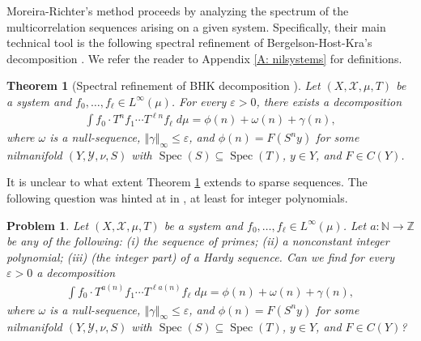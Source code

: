 \documentclass[11pt]{amsart}
\newtheorem{theorem}[lemma]{Theorem}
\newtheorem{problem}{Problem}
\theoremstyle{definition}
\newcommand{\N}{{\mathbb N}}
\newcommand{\Z}{{\mathbb Z}}
\newcommand{\CX}{{\mathcal X}}
\newcommand{\CY}{{\mathcal Y}}
\newcommand{\veps}{\varepsilon}
\newcommand{\norm}[1]{\left\Vert #1\right\Vert}
\newcommand{\1}{{\mathbf{1}}}
\DeclareMathOperator{\spec}{Spec}
\begin{document}
Moreira-Richter's method proceeds by analyzing the spectrum of the multicorrelation sequences arising on a given system. Specifically, their main technical tool is the following spectral refinement of Bergelson-Host-Kra's decomposition \cite[Theorem 1.9]{BHK05}. We refer the reader to Appendix \ref{A: nilsystems} for definitions.
\begin{theorem}[Spectral refinement of BHK decomposition {\cite[Theorem 2.1]{MR19}}]\label{T: MR spectral refinement}
    Let $(X, \CX, \mu, T)$ be a system and $f_0, \ldots, f_\ell\in L^\infty(\mu)$. For every $\veps>0$, there exists a decomposition
    \begin{align*}
        \int f_0 \cdot T^nf_1\cdots T^{\ell n}f_\ell\; d\mu = \phi(n) + \omega(n) + \gamma(n),
    \end{align*}
    where $\omega$ is a null-sequence, $\norm{\gamma}_\infty\leq \veps$, and $\phi(n)=F(S^ny)$ for some nilmanifold $(Y, \CY, \nu, S)$ with $\spec(S)\subseteq \spec(T)$, $y\in Y$, and $F\in C(Y)$.
\end{theorem}
It is unclear to what extent Theorem \ref{T: MR spectral refinement} extends to sparse sequences.
The following question was hinted at in \cite{MR19}, at least for integer polynomials.
\begin{problem}
    Let $(X, \CX, \mu, T)$ be a system and $f_0, \ldots, f_\ell\in L^\infty(\mu)$. Let $a:\N\to\Z$ be any of the following: (i) the sequence of primes; (ii) a nonconstant integer polynomial; (iii) (the integer part) of a Hardy sequence. Can we find for every $\veps>0$ a decomposition
    \begin{align*}
        \int f_0 \cdot T^{a(n)}f_1\cdots T^{\ell a(n)}f_\ell\; d\mu = \phi(n) + \omega(n) + \gamma(n),
    \end{align*}
    where $\omega$ is a null-sequence, $\norm{\gamma}_\infty\leq \veps$, and $\phi(n)=F(S^ny)$ for some nilmanifold $(Y, \CY, \nu, S)$ with $\spec(S)\subseteq \spec(T)$, $y\in Y$, and $F\in C(Y)$?
\end{problem}
\end{document}
